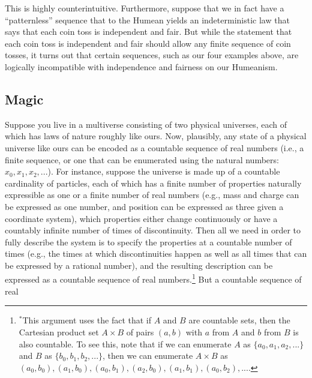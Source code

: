 This is highly counterintuitive. 
Furthermore, suppose that we in fact have a ``patternless'' sequence that to the Humean yields an indeterministic law that says 
that each coin toss is independent and fair. But while the statement that each coin toss is independent and fair should allow any 
finite sequence of coin tosses, it turns out that certain sequences, such as our four examples above, are logically incompatible with 
independence and fairness on our Humeanism.

\subsection{Magic}\label{sec:magic}
Suppose you live in a multiverse consisting of two physical universes, each of which has laws of nature roughly like 
ours. Now, plausibly, any state of a physical universe like ours can be encoded as a countable sequence of real numbers (i.e., a finite
sequence, or one that can be enumerated using the natural numbers: $x_0,x_1,x_2,...$). For instance, suppose the universe is made up of 
a countable cardinality of particles, each of which has a finite number of properties naturally expressible as one or a finite number of real 
numbers (e.g., mass and charge can be expressed as one number, and position can be expressed as three given a coordinate system), which
properties either change continuously or have a countably infinite number of times of discontinuity. Then all we need in order to fully
describe the system is to specify the properties at a countable number of times (e.g., the times at which discontinuities happen as well as
all times that can be expressed by a rational number), and the resulting description can be expressed as a countable sequence of real 
numbers.\footnote{\label{note:product}$^*$This argument uses the fact that if $A$ and $B$ are countable sets, then the Cartesian product set $A\times B$ of pairs $(a,b)$ with
$a$ from $A$ and $b$ from $B$ is also countable. To see this, note that if we can enumerate $A$ as $\{ a_0,a_1,a_2,... \}$ and
$B$ as $\{ b_0,b_1,b_2,... \}$, then we can enumerate $A\times B$ as $(a_0,b_0), (a_1,b_0), (a_0,b_1), (a_2,b_0), (a_1,b_1), (a_0,b_2),...$.} But a countable sequence of real
